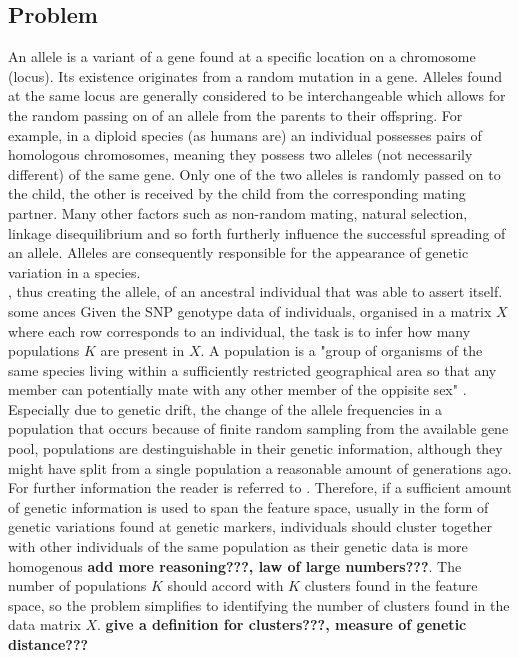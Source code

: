\documentclass[a4paper, 11pt]{article}
\begin{document}
\subsection{Problem}
An allele is a variant of a gene found at a specific location on a chromosome (locus). Its existence originates from a random mutation in a gene. Alleles found at the same locus are generally considered to be interchangeable which allows for the random passing on of an allele from the parents to their offspring. For example, in a diploid species (as humans are) an individual possesses pairs of homologous chromosomes, meaning they possess two alleles (not necessarily different) of the same gene. Only one of the two alleles is randomly passed on to the child, the other is received by the child from the corresponding mating partner. Many other factors such as non-random mating, natural selection, linkage disequilibrium and so forth furtherly influence the successful spreading of an allele.
Alleles are consequently responsible for the appearance of genetic variation in a species.\\
, thus creating the allele, of an ancestral individual that was able to assert itself. some ances 
Given the SNP genotype data of individuals, organised in a matrix $X$ where each row corresponds to an individual, the task is to infer how many populations $K$ are present in $X$. A population is a "group of organisms of the same species living within a sufficiently restricted geographical area so that any member can potentially mate with any other member of the oppisite sex" \parencite{hartl1997principles}. Especially due to genetic drift, the change of the allele frequencies in a population that occurs because of finite random sampling from the available gene pool, populations are destinguishable in their genetic information, although they might have split from a single population a reasonable amount of generations ago. For further information the reader is referred to \parencite{hartl1997principles}. Therefore, if a sufficient amount of genetic information is used to span the feature space, usually in the form of genetic variations found at genetic markers, individuals should cluster together with other individuals of the same population as their genetic data is more homogenous \textbf{add more reasoning???, law of large numbers???}. The number of populations $K$ should accord with $K$ clusters found in the feature space, so the problem simplifies to identifying the number of clusters found in the data matrix $X$. \textbf{give a definition for clusters???, measure of genetic distance???}
\end{document}
